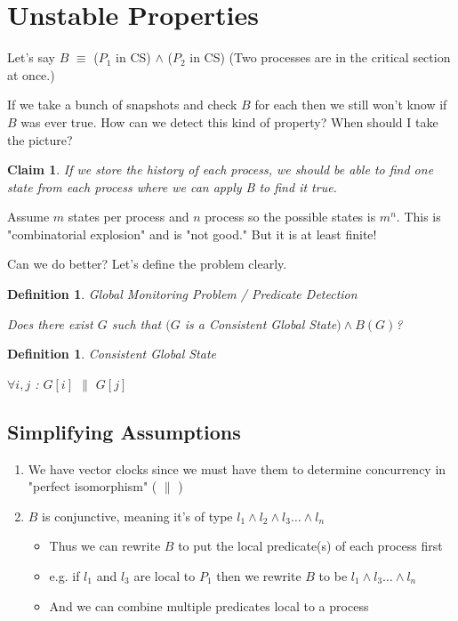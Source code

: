 \documentclass[twoside]{article}
\newtheorem{claim}[theorem]{Claim}
\newtheorem{definition}[theorem]{Definition}
\begin{document}
\section{Unstable Properties}

Let's say $B$ $\equiv$ ($P_1$ in CS) $\land$ ($P_2$ in CS)\newline
(Two processes are in the critical section at once.)

If we take a bunch of snapshots and check $B$ for each then we still won't know if $B$ was ever true. How can we detect this kind of property? When should I take the picture?

\begin{claim}
If we store the history of each process, we should be able to find one state from each process where we can apply B to find it true.
\end{claim}

Assume $m$ states per process and $n$ process so the possible states is $m^n$. This is "combinatorial explosion" and is "not good." But it is at least finite!

Can we do better? Let's define the problem clearly.

\begin{definition}
Global Monitoring Problem / Predicate Detection

Does there exist $G$ such that\newline
$(G$ is a \textit{Consistent Global State}$) \land B(G)$?
\end{definition}

\begin{definition}
Consistent Global State

$\forall i,j$ : $G[i]$ $\|$ $G[j]$
\end{definition}

\subsection{Simplifying Assumptions}

\begin{enumerate}
   \item We have vector clocks since we must have them to determine concurrency in "perfect isomorphism"  ( $\|$ )
   \item $B$ is conjunctive, meaning it's of type  $l_1 \land l_2 \land l_3  \ldots \land l_n$
   \begin{itemize}
        \item Thus we can rewrite $B$ to put the local predicate(s) of each process first
        \item e.g. if $l_1$ and $l_3$ are local to $P_1$ then we rewrite $B$ to be $l_1 \land l_3 \ldots \land l_n$
        \item And we can combine multiple predicates local to a process
    \end{itemize}
\end{enumerate}
\end{document}
